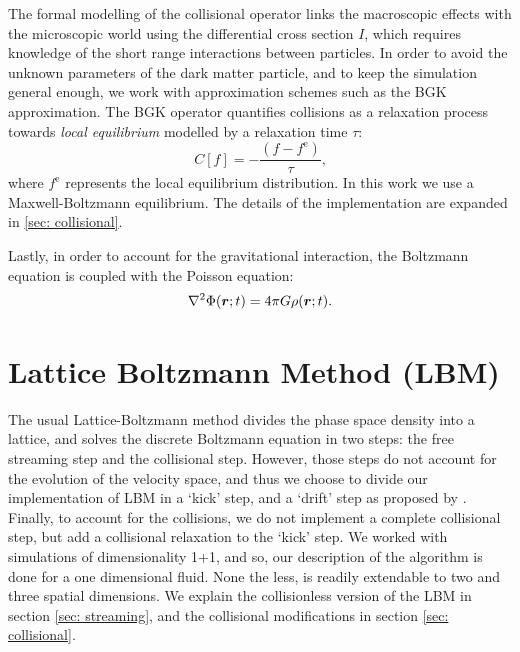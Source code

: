 \documentclass[fleqn,usenatbib]{mnras}
\newcommand{\dens}[1][t]{\rho(\vb*{r};#1)}
\newcommand{\pot}[1][t]{\Phi(\vb*{r};#1)}
\begin{document}
The formal modelling of the collisional operator links the macroscopic effects with the microscopic world using the differential cross section $I$, which requires knowledge of the short range interactions between particles. In order to avoid the unknown parameters of the dark matter particle, and to keep the simulation general enough, we work with approximation schemes such as the BGK approximation.
The BGK operator quantifies collisions as a relaxation process towards \emph{local equilibrium} modelled by a relaxation time $\tau$:
\begin{equation}
\label{eq: bgk_operator}
C[f] = -\frac{(f-f^\text{e})}{\tau} \text{,}
\end{equation}
where $f^\text{e}$ represents the local equilibrium distribution. In this work we use a Maxwell-Boltzmann equilibrium. The details of the implementation are expanded in \ref{sec: collisional}.

Lastly, in order to account for the gravitational interaction, the Boltzmann equation is coupled with the Poisson equation:
\begin{equation}
\laplacian \pot = 4 \pi G \dens .
\end{equation}
\section{Lattice Boltzmann Method (LBM)}
\label{boltz}
The usual Lattice-Boltzmann method divides the phase space density into a lattice, and solves the discrete Boltzmann equation in two steps: the free streaming step and the collisional step. 
However, those steps do not account for the evolution of the velocity space, and thus we choose to divide our implementation of LBM in a `kick' step, and a `drift' step as proposed by \citet{integerLatticeDynamics}.
Finally, to account for the collisions, we do not implement a complete collisional step, but add a collisional relaxation to the `kick' step.
We worked with simulations of dimensionality 1+1, and so, our description of the algorithm is done for a one dimensional fluid. None the less, is readily extendable to two and three spatial dimensions. We explain the collisionless version of the LBM in section \ref{sec: streaming}, and the collisional modifications in section \ref{sec: collisional}.
\end{document}
